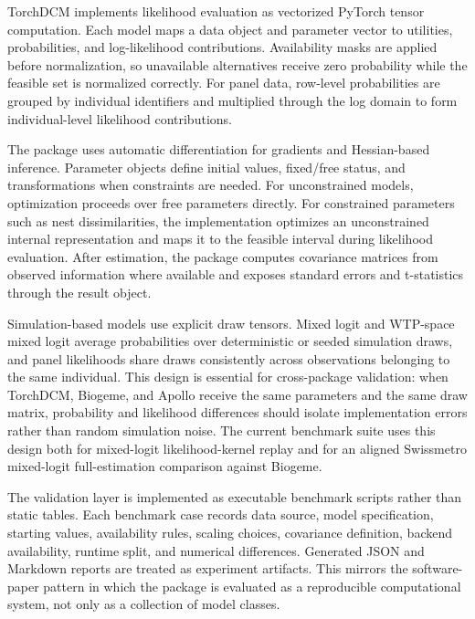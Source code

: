 TorchDCM implements likelihood evaluation as vectorized PyTorch tensor computation.
Each model maps a data object and parameter vector to utilities, probabilities, and log-likelihood contributions.
Availability masks are applied before normalization, so unavailable alternatives receive zero probability while the feasible set is normalized correctly.
For panel data, row-level probabilities are grouped by individual identifiers and multiplied through the log domain to form individual-level likelihood contributions.

The package uses automatic differentiation for gradients and Hessian-based inference.
Parameter objects define initial values, fixed/free status, and transformations when constraints are needed.
For unconstrained models, optimization proceeds over free parameters directly.
For constrained parameters such as nest dissimilarities, the implementation optimizes an unconstrained internal representation and maps it to the feasible interval during likelihood evaluation.
After estimation, the package computes covariance matrices from observed information where available and exposes standard errors and t-statistics through the result object.

Simulation-based models use explicit draw tensors.
Mixed logit and WTP-space mixed logit average probabilities over deterministic or seeded simulation draws, and panel likelihoods share draws consistently across observations belonging to the same individual.
This design is essential for cross-package validation: when TorchDCM, Biogeme, and Apollo receive the same parameters and the same draw matrix, probability and likelihood differences should isolate implementation errors rather than random simulation noise.
The current benchmark suite uses this design both for mixed-logit likelihood-kernel replay and for an aligned Swissmetro mixed-logit full-estimation comparison against Biogeme.

The validation layer is implemented as executable benchmark scripts rather than static tables.
Each benchmark case records data source, model specification, starting values, availability rules, scaling choices, covariance definition, backend availability, runtime split, and numerical differences.
Generated JSON and Markdown reports are treated as experiment artifacts.
This mirrors the software-paper pattern in which the package is evaluated as a reproducible computational system, not only as a collection of model classes.
